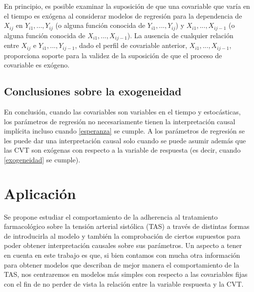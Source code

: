 \documentclass[12pt]{article}
\def\fullcovname{adherencia al tratamiento farmacológico}
\def\cvt{covariable que varía en el tiempo}
\def\xseqjminus{$X_{i1}, ..., X_{ij-1}$}
\def\yseqj{$Y_{i1}, ..., Y_{ij}$}
\def\yseqjminus{$Y_{i1}, ..., Y_{ij-1}$}
\begin{document}
En principio, es posible examinar la suposición de que una \cvt{} es exógena al considerar modelos de regresión para la
dependencia de $X_{ij}$ en \yseqj{} (o alguna función conocida de \yseqj{}) y \xseqjminus{} (o alguna función
conocida de \xseqjminus{}). La ausencia de cualquier relación entre $X_{ij}$ e \yseqjminus{}, dado
el perfil de covariable anterior, \xseqjminus{}, proporciona soporte para la validez de la suposición de que
el proceso de covariable es exógeno.

\subsection{Conclusiones sobre la exogeneidad}

En conclusión, cuando las covariables son variables en el tiempo y estocásticas, los parámetros de regresión no
necesariamente tienen la interpretación causal implícita incluso cuando \ref{esperanza} se cumple. A los parámetros de
regresión se les puede dar una interpretación causal solo cuando se puede asumir además que las CVT son exógenas con
respecto a la variable de respuesta (es decir, cuando \ref{exogeneidad} se cumple).

\newpage
\section{Aplicación}

Se propone estudiar el comportamiento de la \fullcovname{} sobre la tensión arterial sistólica (TAS) a través de distintas
formas de introducirla al modelo y también la comprobación de ciertos supuestos para poder obtener interpretación causales sobre
sus parámetros. Un aspecto a tener en cuenta en este trabajo es que, si bien contamos con mucha otra información para
obtener modelos que describan de mejor manera el comportamiento de la TAS, nos centraremos en modelos más simples con
respecto a las covariables fijas con el fin de no perder de vista la relación entre la variable respuesta y la CVT.
\end{document}
